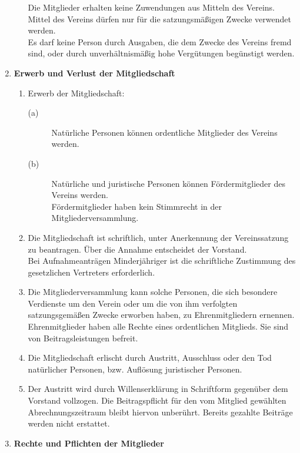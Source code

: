 \begin{enumerate}[label=\bfseries §\arabic*]
\begin{enumerate}[label=\bfseries (\arabic*)]
            Die Mitglieder erhalten keine Zuwendungen aus Mitteln des Vereins. Mittel des Vereins dürfen nur für die satzungsmäßigen Zwecke verwendet werden.\\
            Es darf keine Person durch Ausgaben, die dem Zwecke des Vereins fremd sind, oder durch unverhältnismäßig hohe Vergütungen begünstigt werden.
    \end{enumerate}
  \item \textbf{Erwerb und Verlust der Mitgliedschaft}
    \begin{enumerate}[label=\bfseries (\arabic*)]
      \item Erwerb der Mitgliedschaft:
        \begin{description}
          \item[(a)] Natürliche Personen können ordentliche Mitglieder des Vereins werden.
          \item[(b)] Natürliche und juristische Personen können Fördermitglieder des Vereins werden.\\ Fördermitglieder haben kein Stimmrecht in der Mitgliederversammlung.
        \end{description}
      \item Die Mitgliedschaft ist schriftlich, unter Anerkennung der Vereinssatzung zu beantragen. Über die Annahme entscheidet der Vorstand.\\Bei Aufnahmeanträgen Minderjähriger ist die schriftliche Zustimmung des gesetzlichen Vertreters erforderlich.
      \item Die Mitgliederversammlung kann solche Personen, die sich besondere Verdienste um den Verein oder um die von ihm verfolgten satzungsgemäßen Zwecke erworben haben, zu Ehrenmitgliedern ernennen.\\Ehrenmitglieder haben alle Rechte eines ordentlichen Mitglieds. Sie sind von Beitragsleistungen befreit.
      \item Die Mitgliedschaft erlischt durch Austritt, Ausschluss oder den Tod natürlicher Personen, bzw. Auflösung juristischer Personen.
      \item Der Austritt wird durch Willenserklärung in Schriftform gegenüber dem Vorstand vollzogen. Die Beitragspflicht für den vom Mitglied gewählten Abrechnungszeitraum bleibt hiervon unberührt. Bereits gezahlte Beiträge werden nicht erstattet.
    \end{enumerate}
  \clearpage
  \item \textbf{Rechte und Pflichten der Mitglieder}
    \begin{enumerate}[label=\bfseries (\arabic*)]

\end{enumerate}
\end{enumerate}
